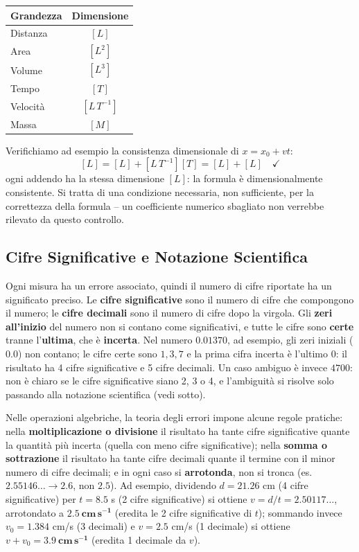 \documentclass[a4paper,11pt]{article}
\begin{document}
\begin{center}
\small
\begin{tabular}{lc}
\toprule
Grandezza & Dimensione \\
\midrule
Distanza & $[L]$ \\
Area & $[L^2]$ \\
Volume & $[L^3]$ \\
Tempo & $[T]$ \\
Velocità & $[L\,T^{-1}]$ \\
Massa & $[M]$ \\
\bottomrule
\end{tabular}
\end{center}

Verifichiamo ad esempio la consistenza dimensionale di $x=x_0+vt$:
\[
[L] = [L] + [L\,T^{-1}][T] = [L] + [L] \quad\checkmark
\]
ogni addendo ha la stessa dimensione $[L]$: la formula è dimensionalmente consistente. Si tratta di una condizione necessaria, non sufficiente, per la correttezza della formula -- un coefficiente numerico sbagliato non verrebbe rilevato da questo controllo.

\subsection{Cifre Significative e Notazione Scientifica}

Ogni misura ha un errore associato, quindi il numero di cifre riportate ha un significato preciso. Le \textbf{cifre significative} sono il numero di cifre che compongono il numero; le \textbf{cifre decimali} sono il numero di cifre dopo la virgola. Gli \textbf{zeri all'inizio} del numero non si contano come significativi, e tutte le cifre sono \textbf{certe} tranne l'\textbf{ultima}, che è \textbf{incerta}. Nel numero $0.01370$, ad esempio, gli zeri iniziali ($0.0$) non contano; le cifre certe sono $1,3,7$ e la prima cifra incerta è l'ultimo $0$: il risultato ha 4 cifre significative e 5 cifre decimali. Un caso ambiguo è invece $4700$: non è chiaro se le cifre significative siano 2, 3 o 4, e l'ambiguità si risolve solo passando alla notazione scientifica (vedi sotto).

Nelle operazioni algebriche, la teoria degli errori impone alcune regole pratiche: nella \textbf{moltiplicazione o divisione} il risultato ha tante cifre significative quante la quantità più incerta (quella con meno cifre significative); nella \textbf{somma o sottrazione} il risultato ha tante cifre decimali quante il termine con il minor numero di cifre decimali; e in ogni caso si \textbf{arrotonda}, non si tronca (es. $2.55146\ldots \to 2.6$, non $2.5$). Ad esempio, dividendo $d=21.26$ cm (4 cifre significative) per $t=8.5$ s (2 cifre significative) si ottiene $v=d/t=2.50117\ldots$, arrotondato a $\mathbf{2.5\ cm\,s^{-1}}$ (eredita le 2 cifre significative di $t$); sommando invece $v_0=1.384$ cm/s (3 decimali) e $v=2.5$ cm/s (1 decimale) si ottiene $v+v_0=\mathbf{3.9\ cm\,s^{-1}}$ (eredita 1 decimale da $v$).
\end{document}
